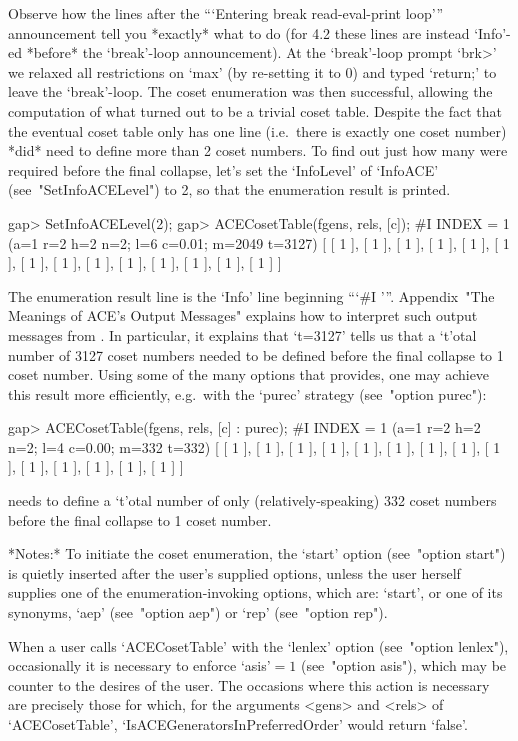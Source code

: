 Observe how the lines  after  the  ```Entering  break  read-eval-print
loop''' announcement tell you *exactly* what to  do  (for  {\GAP}  4.2
these  lines  are  instead   `Info'-ed   *before*   the   `break'-loop
announcement). At  the  `break'-loop  prompt  `brk>'  we  relaxed  all
restrictions on `max' (by re-setting it to 0) and typed  `return;'  to
leave the `break'-loop. The coset  enumeration  was  then  successful,
allowing the computation of what turned out  to  be  a  trivial  coset
table. Despite the fact that the eventual coset  table  only  has  one
line (i.e.~there is exactly one coset number)  {\ACE}  *did*  need  to
define more than 2 coset numbers. To  find  out  just  how  many  were
required before the final  collapse,  let's  set  the  `InfoLevel'  of
`InfoACE' (see~"SetInfoACELevel") to 2, so that the {\ACE} enumeration
result is printed.

\beginexample
gap> SetInfoACELevel(2);
gap> ACECosetTable(fgens, rels, [c]);
#I  INDEX = 1 (a=1 r=2 h=2 n=2; l=6 c=0.01; m=2049 t=3127)
[ [ 1 ], [ 1 ], [ 1 ], [ 1 ], [ 1 ], [ 1 ], [ 1 ], [ 1 ], [ 1 ], [ 1 ], 
  [ 1 ], [ 1 ], [ 1 ], [ 1 ] ]
\endexample

The enumeration result line is the `Info' line  beginning  ```\#I '''.
Appendix~"The Meanings of  ACE's  Output  Messages"  explains  how  to
interpret such output messages from {\ACE}. In particular, it explains
that `t=3127' tells us that a `t'otal number  of  3127  coset  numbers
needed to be defined before the final  collapse  to  1  coset  number.
Using some of the many options that {\ACE} provides, one  may  achieve
this  result  more  efficiently,  e.g.~with   the   `purec'   strategy
(see~"option purec"):

\beginexample
gap> ACECosetTable(fgens, rels, [c] : purec);
#I  INDEX = 1 (a=1 r=2 h=2 n=2; l=4 c=0.00; m=332 t=332)
[ [ 1 ], [ 1 ], [ 1 ], [ 1 ], [ 1 ], [ 1 ], [ 1 ], [ 1 ], [ 1 ], [ 1 ], 
  [ 1 ], [ 1 ], [ 1 ], [ 1 ] ]
\endexample

{\ACE} needs to define a `t'otal number of only  (relatively-speaking)
332 coset numbers before the final collapse to 1 coset number.

*Notes:* 
To initiate the coset enumeration,  the  `start'  option  (see~"option
start") is quietly inserted after the user's supplied options,  unless
the user herself supplies one  of  the  enumeration-invoking  options,
which are: `start', or one of its synonyms, `aep'  (see~"option  aep")
or `rep' (see~"option rep").

When  a  user  calls  `ACECosetTable'   with   the   `lenlex'   option
(see~"option  lenlex"),  occasionally  it  is  necessary  to   enforce
`asis'${}=1$ (see~"option asis"), which may be counter to the  desires
of the  user.  The  occasions  where  this  action  is  necessary  are
precisely those for which, for the  arguments  <gens>  and  <rels>  of
`ACECosetTable',   `IsACEGeneratorsInPreferredOrder'   would    return
`false'.

